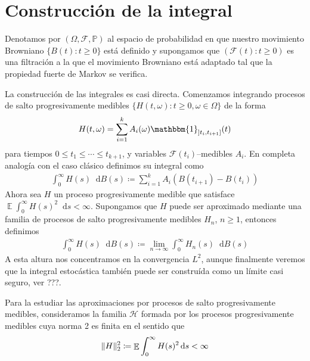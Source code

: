 \documentclass{report}
\newcommand{\characteristic}{\mathbbm{1}}
\newcommand{\prob}{\mathbb{P}}
\newcommand{\events}{\mathcal{F}}
\newcommand{\brownian}{B}
\newcommand{\dd}{\mathop{}\!\mathrm{d}}
\DeclareMathOperator{\Expectation}{\mathbb{E}}
\DeclarePairedDelimiter{\norm}{\|}{\|}
\theoremstyle{plain}
\theoremstyle{remark}
\theoremstyle{definition}
\begin{document}
\section{Construcción de la integral}
Denotamos por \((\Omega, \events, \prob)\) al espacio de probabilidad en que nuestro movimiento Browniano \(\{\brownian(t) : t \geq 0\}\) está definido y supongamos que \((\events(t) : t \geq 0)\) es una filtración a la que el movimiento Browniano está adaptado tal que la propiedad fuerte de Markov se verifica.

La construcción de las integrales es casi directa.
Comenzamos integrando procesos de salto progresivamente medibles \(\{H(t, \omega) : t \geq 0, \omega \in \Omega\}\) de la forma
\begin{align}
  H(t, \omega)
  =
  \sum_{i = 1}^k A_i(\omega)\characteristic_{\left] t_i, t_{i + 1} \right]}(t)
\end{align}
para tiempos \(0 \leq t_1 \leq \cdots \leq t_{k + 1}\), y variables \(\events(t_i)\)--medibles \(A_i\).
En completa analogía con el caso clásico definimos su integral como
\begin{align}
  \int_0^{\infty} H(s) \dd \brownian(s)
  \coloneqq
  \sum_{i = 1}^k A_i (\brownian(t_{i + 1}) - \brownian(t_i))
\end{align}
Ahora sea \(H\) un proceso progresivamente medible que satisface \(\Expectation \int_0^{\infty} H(s)^2 \dd s < \infty\).
Supongamos que \(H\) puede ser aproximado mediante una familia de procesos de salto progresivamente medibles \(H_n\), \(n \geq 1\), entonces definimos
\begin{align}
  \int_0^\infty H(s) \dd \brownian(s)
  \coloneqq
  \lim_{n \rightarrow \infty} \int_0^\infty H_n(s) \dd \brownian(s)
  \label{definition:stochasticIntegralWithRespectToBrownianMotion_norm2Approximation}
\end{align}
A esta altura nos concentramos en la convergencia \(L^2\), aunque finalmente veremos que la integral estocástica también puede ser construída como un límite casi seguro, ver ???.

Para la estudiar las aproximaciones por procesos de salto progresivamente medibles, consideramos la familia \(\mathcal{H}\) formada por los procesos progresivamente medibles cuya norma 2 es finita en el sentido que
\begin{align}
  \norm{H}_2^2
  \coloneqq
  \Expectation \int_0^{\infty} H(s)^2 \dd s
  <
  \infty
\end{align}
\end{document}

